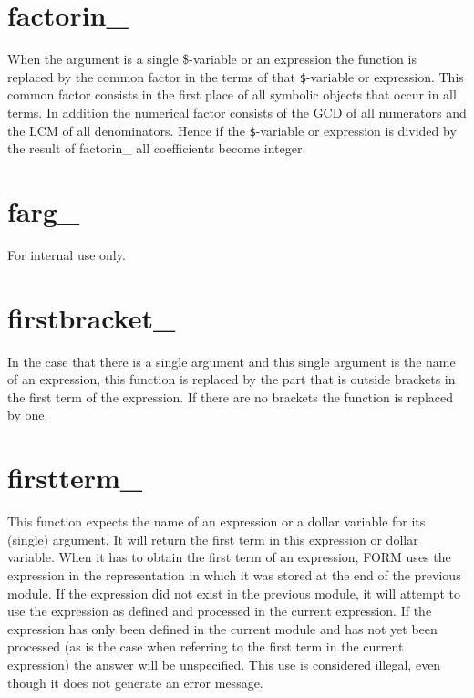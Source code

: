 \section{factorin\_}
\label{funfactorin}
\noindent When the argument is a single \$-variable or 
an expression the function is replaced by the common 
factor in the terms of that \verb:$:-variable or expression. This common 
factor consists in the first place of all symbolic objects that occur in 
all terms. In addition the numerical factor consists of the GCD 
of all numerators and the LCM of all denominators. Hence if the 
\verb:$:-variable or expression is divided by the result of factorin\_ all 
coefficients become integer.


\section{farg\_}
\label{funfarg}
\noindent For internal use only.


\section{firstbracket\_}
\label{funfirstbracket}
\noindent In the case that there is a single argument and this 
single argument is the name of an expression, this function is replaced by 
the part that is outside brackets in the first term of the expression. If 
there are no brackets the function is replaced by one.


\section{firstterm\_}
\label{funfirstterm}

\noindent This function expects the name of an expression or a dollar 
variable for its (single) argument. It will return the first term in this 
expression or dollar variable. When it has to obtain the first term of an 
expression, FORM uses the expression in the representation in which it was 
stored at the end of the previous module. If the expression did not exist 
in the previous module, it will attempt to use the expression as defined 
and processed in the current expression. If the expression has only been 
defined in the current module and has not yet been processed (as is the 
case when referring to the first term in the current expression) the answer 
will be unspecified. This use is considered illegal, even though it does 
not generate an error message.


